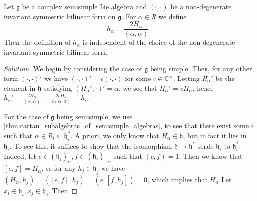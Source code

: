\documentclass{report}
\begin{document}
\begin{exercise}[Exercise 6.7]
    Let $\mathfrak g$ be a complex semisimple Lie algebra and $(\cdot, \cdot)$ be a non-degenerate invariant symmetric bilinear form on $\mathfrak g$.
    For $\alpha \in R$ we define
    \[
    h_\alpha = \frac{2H_\alpha}{(\alpha, \alpha)}.
    \]
    Then the definition of $h_\alpha$ is independent of the choice of the non-degenerate invariant symmetric bilinear form.
\end{exercise}
\begin{proof}[Solution]
    We begin by considering the case of $\mathfrak g$ being simple.
    Then, for any other form $(\cdot, \cdot)'$ we have $(\cdot, \cdot)' = c (\cdot, \cdot)$ for some $c \in \mathbb C^\times$.
    Letting $H_\alpha'$ be the element in $\mathfrak h$ satisfying $(H_\alpha', \cdot )' = \alpha$, we see that $H_\alpha' = c H_\alpha$, hence $h_\alpha' = \frac{2H_\alpha'}{(\alpha, \alpha)'} = \frac{2c H_\alpha}{c (\alpha, \alpha)} = h_\alpha$.

    For the case of $\mathfrak g$ being semisimple, we use \cref{thm:cartan_subalgebras_of_semisimple_algebras}, to see that there exist some $i$ such that $\alpha \in R_i \subseteq \mathfrak h_i^*$.
    A priori, we only know that $H_\alpha \in \mathfrak h$, but in fact it lies in $\mathfrak h_i$.
    To see this, it suffices to show that the isomorphism $\mathfrak h \to \mathfrak h^*$ sends $\mathfrak h_i$ to $\mathfrak h_i^*$.
    Indeed, let $e \in \left(\mathfrak h_i\right)_\alpha, f \in \left( \mathfrak h_i \right)_{-\alpha}$ such that $(e,f) = 1$.
    Then we know that $[e,f] = H_\alpha$, so for any $h_j \in \mathfrak h_j$ we have $(H_\alpha, h_j) = ([e,f], h_j) = (e, [f,h_j]) = 0$, which implies that $H_\alpha$
    Let $x_i \in \mathfrak h_i, x_j \in \mathfrak h_j$.
    Then 
\end{proof}
\end{document}
